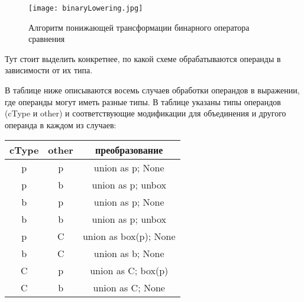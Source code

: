 \begin{figure}[h]
    \centering
    \texttt{[image: binaryLowering.jpg]}
    \caption{Алгоритм понижающей трансформации бинарного оператора сравнения}\label{fig:figure}
\end{figure}

Тут стоит выделить конкретнее, по какой схеме обрабатываются операнды в зависимости от их типа.

В таблице ниже описываются восемь случаев обработки операндов в выражении, где операнды могут иметь разные типы.
В таблице указаны типы операндов (cType и other) и соответствующие модификации для объединения и другого операнда
в каждом из случаев:

\begin{table}[h]
    \centering
    \begin{tabular}{|c|c|c|}
        \hline
        cType & other & преобразование \\
        \hline
        p & p & union as p; None \\
        \hline
        p & b & union as p; unbox  \\
        \hline
        b & p & union as p; None   \\
        \hline
        b & b & union as p; unbox  \\
        \hline
        p & C & union as box(p); None  \\
        \hline
        b & C & union as b; None  \\
        \hline
        C & p & union as C; box(p)  \\
        \hline
        C & b & union as C; None  \\
        \hline
    \end{tabular}
\end{table}

